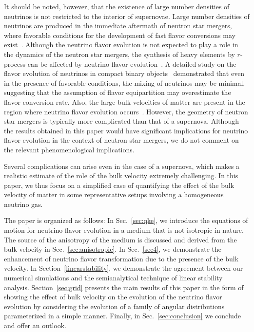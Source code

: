 \documentclass[aps, prd, 10pt, twocolumn, superscriptaddress, noshowpacs, preprintnumbers, longbibliography, groupedaddress, footinbib, bibnotes]{revtex4-1}
\begin{document}
It should be noted, however, that the existence of large number densities of neutrinos is not restricted to the interior of supernovae. Large number densities of neutrinos are produced in the immediate aftermath of neutron star mergers, where favorable conditions for the development of fast flavor conversions may exist~\cite{Wu:2017qpc,Wu:2017drk}. Although the neutrino flavor evolution is not expected to play a role in the dynamics of the neutron star mergers, the synthesis of heavy elements by $r$-process can be affected by neutrino flavor evolution~\cite{George:2020veu, Li:2021vqj}. A detailed study on the flavor evolution of neutrinos in compact binary objects~\cite{Padilla-Gay:2020uxa} demonstrated that even in the presence of favorable conditions, the mixing of neutrinos may be minimal, suggesting that the assumption of flavor equipartition may overestimate the flavor conversion rate. Also, the large bulk velocities of matter are present in the region where neutrino flavor evolution occurs~\cite{Frensel:2016fge, Hotokezaka:2012ze, Kyutoku:2013wxa}. However, the geometry of neutron star mergers is typically more complicated than that of a supernova. Although the results obtained in this paper would have significant implications for neutrino flavor evolution in the context of neutron star mergers, we do not comment on the relevant phenomenological implications. 

Several complications can arise even in the case of a supernova, which makes a realistic estimate of the role of the bulk velocity extremely challenging. 
In this paper, we thus focus on a simplified case of quantifying the effect of the bulk velocity of matter in some representative setups involving a homogeneous neutrino gas.

The paper is organized as follows: In Sec.~\ref{sec:qke}, we introduce the equations of motion for neutrino flavor evolution in a medium that is not isotropic in nature. The source of the anisotropy of the medium is discussed and derived from the bulk velocity in Sec.~\ref{sec:anisotropic}. In Sec.~\ref{sec4}, we demonstrate the enhancement of neutrino flavor transformation due to the presence of the bulk velocity. In Section~\ref{linearstability}, we demonstrate the agreement between our numerical simulations and the semianalytical technique of linear stability analysis. Section~\ref{sec:grid} presents the main results of this paper in the form of showing the effect of bulk velocity on the evolution of the neutrino flavor evolution by considering the evolution of a family of angular distributions parameterized in a simple manner. Finally, in Sec.~\ref{sec:conclusion} we conclude and offer an outlook.  
\end{document}
